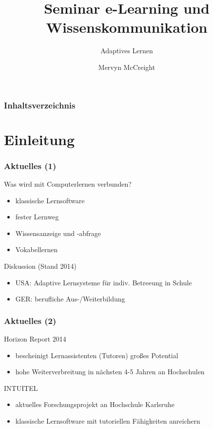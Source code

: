 \documentclass{beamer}
\title[Seminar]{Seminar e-Learning und Wissenskommunikation}
\subtitle[Remailer]{Adaptives Lernen}
\author[M. McCreight]{Mervyn McCreight}
\institute[FH-Wedel]{FH-Wedel}
\begin{document}
  \usetikzlibrary{positioning}
  \usetikzlibrary{shapes}
  \usetikzlibrary{arrows,automata}


\frame{\titlepage}

\begin{frame}
	\frametitle{Inhaltsverzeichnis}
	\tableofcontents
\end{frame}

\section{Einleitung}
\begin{frame}
  \frametitle{Aktuelles (1)}

  \begin{block}{Was wird mit Computerlernen verbunden?}
    \begin{itemize}
      \item klassische Lernsoftware
      \item fester Lernweg
      \item Wissensanzeige und -abfrage
      \item Vokabellernen
    \end{itemize}
  \end{block}

  \begin{block}{Diskussion (Stand 2014)}
    \begin{itemize}
      \item USA: Adaptive Lernsysteme für indiv. Betreeung in Schule
      \item GER: berufliche Aus-/Weiterbildung
    \end{itemize}
  \end{block}
\end{frame}

\begin{frame}
  \frametitle{Aktuelles (2)}

  \begin{block}{Horizon Report 2014}
    \begin{itemize}
      \item bescheinigt Lernassistenten (Tutoren) großes Potential
      \item hohe Weiterverbreitung in nächsten 4-5 Jahren an Hochschulen
    \end{itemize}
  \end{block}

  \begin{block}{INTUITEL}
    \begin{itemize}
      \item aktuelles Forschungsprojekt an Hochschule Karlsruhe
      \item klassische Lernsoftware mit tutoriellen Fähigkeiten anreichern
    \end{itemize}
  \end{block}
\end{frame}
\end{document}
